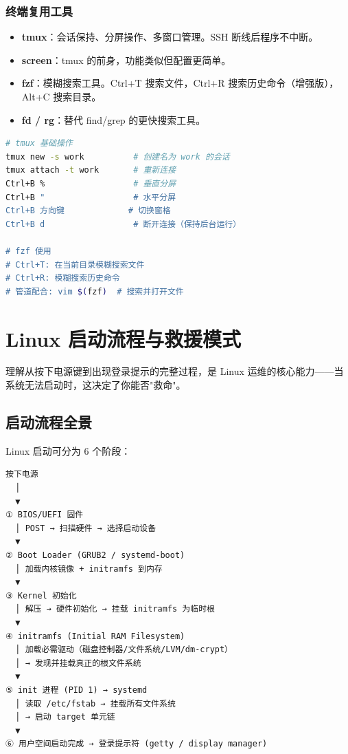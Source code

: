 \documentclass[12pt,UTF8]{ctexbook}
\begin{document}
\subsection*{终端复用工具}

\begin{itemize}
    \item \textbf{tmux}：会话保持、分屏操作、多窗口管理。SSH 断线后程序不中断。
    \item \textbf{screen}：tmux 的前身，功能类似但配置更简单。
    \item \textbf{fzf}：模糊搜索工具。Ctrl+T 搜索文件，Ctrl+R 搜索历史命令（增强版），Alt+C 搜索目录。
    \item \textbf{fd / rg}：替代 find/grep 的更快搜索工具。
\end{itemize}

\begin{lstlisting}[language=bash]
# tmux 基础操作
tmux new -s work          # 创建名为 work 的会话
tmux attach -t work       # 重新连接
Ctrl+B %                  # 垂直分屏
Ctrl+B "                  # 水平分屏
Ctrl+B 方向键             # 切换窗格
Ctrl+B d                  # 断开连接（保持后台运行）

# fzf 使用
# Ctrl+T: 在当前目录模糊搜索文件
# Ctrl+R: 模糊搜索历史命令
# 管道配合: vim $(fzf)  # 搜索并打开文件
\end{lstlisting}

\chapter{Linux 启动流程与救援模式}
\label{chap:boot-process}

理解从按下电源键到出现登录提示的完整过程，是 Linux 运维的核心能力——当系统无法启动时，这决定了你能否"救命"。

\section{启动流程全景}

Linux 启动可分为 6 个阶段：

\begin{lstlisting}
按下电源
  │
  ▼
① BIOS/UEFI 固件
  │ POST → 扫描硬件 → 选择启动设备
  ▼
② Boot Loader (GRUB2 / systemd-boot)
  │ 加载内核镜像 + initramfs 到内存
  ▼
③ Kernel 初始化
  │ 解压 → 硬件初始化 → 挂载 initramfs 为临时根
  ▼
④ initramfs (Initial RAM Filesystem)
  │ 加载必需驱动（磁盘控制器/文件系统/LVM/dm-crypt）
  │ → 发现并挂载真正的根文件系统
  ▼
⑤ init 进程 (PID 1) → systemd
  │ 读取 /etc/fstab → 挂载所有文件系统
  │ → 启动 target 单元链
  ▼
⑥ 用户空间启动完成 → 登录提示符 (getty / display manager)
\end{lstlisting}
\end{document}
